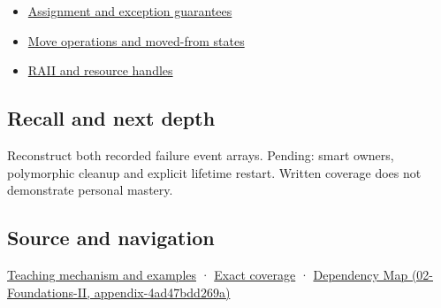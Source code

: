 \begin{itemize}
\tightlist
\item
  \hyperref[appendix-bea6beb5350f]{Assignment and exception guarantees}
\item
  \hyperref[appendix-5636651017c2]{Move operations and moved-from states}
\item
  \hyperref[appendix-69739d3ab49b]{RAII and resource handles}
\end{itemize}

\subsection{Recall and next depth}\label{appendix-9bfe377cef7a-recall-and-next-depth}

Reconstruct both recorded failure event arrays. Pending: smart owners, polymorphic cleanup and explicit lifetime restart. Written coverage does not demonstrate personal mastery.

\subsection{Source and navigation}\label{appendix-9bfe377cef7a-source-and-navigation}

\hyperref[01-foundations-i-ch003-destruction-closes-the-ownership-interval]{Teaching mechanism and examples} · \hyperref[appendix-fd090d982a15-m009---parts-127-147]{Exact coverage} · \href{../02-Foundations-II/main.pdf\#nameddest=appendix-4ad47bdd269a}{Dependency Map (02-Foundations-II, appendix-4ad47bdd269a)}
